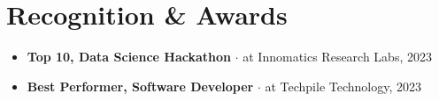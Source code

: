 \documentclass[letterpaper,11pt]{article}
\newcommand{\sep}{\(\cdot\)}
\begin{document}
\section{Recognition \& Awards}
 \begin{itemize}[leftmargin=0.15in, itemsep=1pt]
    \small
    \item \textbf{Top 10, Data Science Hackathon} \sep{} at Innomatics Research Labs, 2023
    \item \textbf{Best Performer, Software Developer} \sep{} at Techpile Technology, 2023
 \end{itemize}
\end{document}
